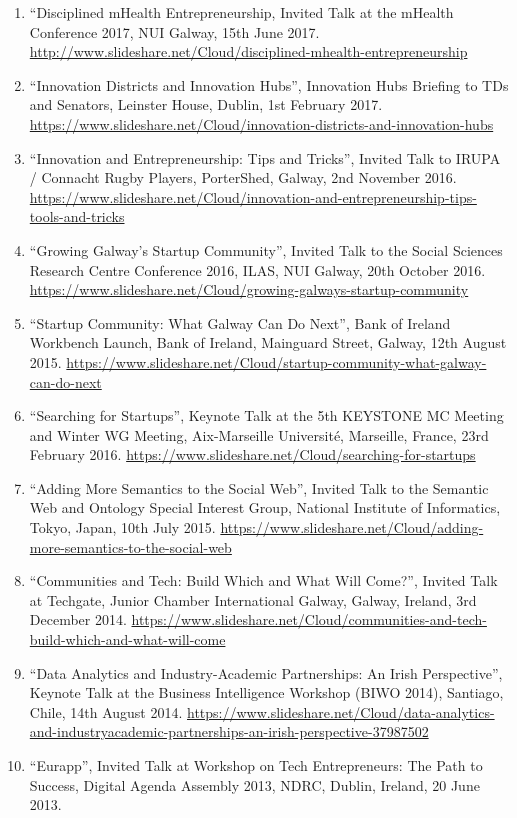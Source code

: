 \documentclass[10pt,a4paper]{res} %
\begin{document}
\begin{resume}
\begin{enumerate}
\item ``Disciplined mHealth Entrepreneurship, Invited Talk at the mHealth Conference 2017, NUI Galway, 15th June 2017. \url{http://www.slideshare.net/Cloud/disciplined-mhealth-entrepreneurship}
\item ``Innovation Districts and Innovation Hubs'', Innovation Hubs Briefing to TDs and Senators, Leinster House, Dublin, 1st February 2017. \url{https://www.slideshare.net/Cloud/innovation-districts-and-innovation-hubs}
\item ``Innovation and Entrepreneurship: Tips and Tricks'', Invited Talk to IRUPA / Connacht Rugby Players, PorterShed, Galway, 2nd November 2016. \url{https://www.slideshare.net/Cloud/innovation-and-entrepreneurship-tips-tools-and-tricks}
\item ``Growing Galway's Startup Community'', Invited Talk to the Social Sciences Research Centre Conference 2016, ILAS, NUI Galway, 20th October 2016. \url{https://www.slideshare.net/Cloud/growing-galways-startup-community}
\item ``Startup Community: What Galway Can Do Next'', Bank of Ireland Workbench Launch, Bank of Ireland, Mainguard Street, Galway, 12th August 2015. \url{https://www.slideshare.net/Cloud/startup-community-what-galway-can-do-next}
\item ``Searching for Startups'', Keynote Talk at the 5th KEYSTONE MC Meeting and Winter WG Meeting, Aix-Marseille Universit\'{e}, Marseille, France, 23rd February 2016. \url{https://www.slideshare.net/Cloud/searching-for-startups}
\item ``Adding More Semantics to the Social Web'', Invited Talk to the Semantic Web and Ontology Special Interest Group, National Institute of Informatics, Tokyo, Japan, 10th July 2015. \url{https://www.slideshare.net/Cloud/adding-more-semantics-to-the-social-web}
\item ``Communities and Tech: Build Which and What Will Come?'', Invited Talk at Techgate, Junior Chamber International Galway, Galway, Ireland, 3rd December 2014. \url{https://www.slideshare.net/Cloud/communities-and-tech-build-which-and-what-will-come}
\item ``Data Analytics and Industry-Academic Partnerships: An Irish Perspective'', Keynote Talk at the Business Intelligence Workshop (BIWO 2014), Santiago, Chile, 14th August 2014. \url{https://www.slideshare.net/Cloud/data-analytics-and-industryacademic-partnerships-an-irish-perspective-37987502}
\item ``Eurapp'', Invited Talk at Workshop on Tech Entrepreneurs: The Path to Success, Digital Agenda Assembly 2013, NDRC, Dublin, Ireland, 20 June 2013.

\end{enumerate}
\end{resume}
\end{document}

